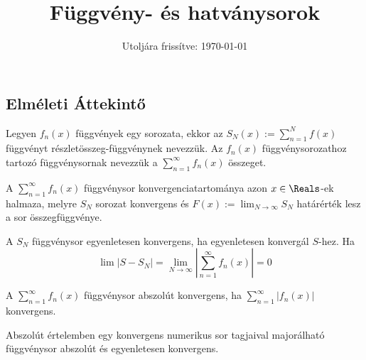 \documentclass[a4paper, 12pt]{scrartcl}
\title{Függvény- és hatványsorok}
\date{Utoljára frissítve: \today}
\begin{document}
\maketitle
\subsection{Elméleti Áttekintő}
\begin{definition}[Függvénysor]
    Legyen $f_n(x)$ függvények egy sorozata, ekkor az $\displaystyle S_N(x):= \sum_{n=1}^{N}f(x)$ függvényt rész\-let\-összeg-függvénynek nevezzük. Az $f_n(x)$ függvénysorozathoz tartozó függvénysornak nevezzük a $\displaystyle \sum_{n=1}^{\infty} f_n(x)$ összeget.
\end{definition}

\begin{definition}[Konvergenciatartomány]
    A $\displaystyle \sum_{n=1}^{\infty} f_n(x)$ függvénysor konvergenciatartománya azon $x \in \Reals$-ek halmaza, melyre $S_N$ sorozat konvergens és $F(x) := \displaystyle \lim_{N \to \infty } S_N$ határérték lesz a sor összegfüggvénye.
\end{definition}

\begin{definition}
    A $S_N$ függvénysor egyenletesen konvergens, ha egyenletesen konvergál $S$-hez. Ha
    \[
    \lim |S-S_N| = \lim_{N \to \infty} \left|\sum_{n = 1}^{\infty} f_n(x)\right| = 0
    \]
\end{definition}

\begin{definition}
    A $\displaystyle \sum_{n=1}^{\infty} f_n(x)$ függvénysor abszolút konvergens, ha $\displaystyle \sum_{n=1}^{\infty} |f_n(x)|$ konvergens.
\end{definition}

\begin{definition}
    Abszolút értelemben egy konvergens numerikus sor tagjaival majorálható függvénysor abszolút és egyenletesen konvergens.
\end{definition}
\end{document}
